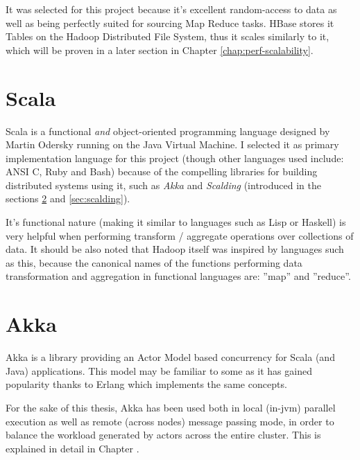 It was selected for this project because it's excellent random-access to data as well as being perfectly suited for sourcing Map Reduce tasks.
HBase stores it Tables on the Hadoop Distributed File System, thus it scales similarly to it, which will be proven in a later section in Chapter \ref{chap:perf-scalability}.

\section{Scala}
\label{sec:scala}
Scala is a functional \textit{and} object-oriented programming language designed by Martin Odersky \cite{scala} running on the Java Virtual Machine.
I selected it as primary implementation language for this project (though other languages used include: ANSI C, Ruby and Bash) because of the compelling 
libraries for building distributed systems using it, such as \textit{Akka} and \textit{Scalding} (introduced in the sections \ref{sec:akka} and \ref{sec:scalding}).

It's functional nature (making it similar to languages such as Lisp or Haskell) is very helpful when performing transform / aggregate operations over collections of data. It should be also noted that Hadoop itself was inspired by languages such as this, because the canonical names of the functions 
performing data transformation and aggregation in functional languages are: ''map'' and ''reduce''.

\section{Akka}
\label{sec:akka}

Akka is a library providing an Actor Model \cite{actor-model} based concurrency for Scala (and Java) applications. 
This model may be familiar to some as it has gained popularity thanks to Erlang \cite{erlang} which implements the same concepts.

For the sake of this thesis, Akka has been used both in local (in-jvm) parallel execution as well as remote (across nodes) message passing mode,
in order to balance the workload generated by actors across the entire cluster. This is explained in detail in Chapter .

